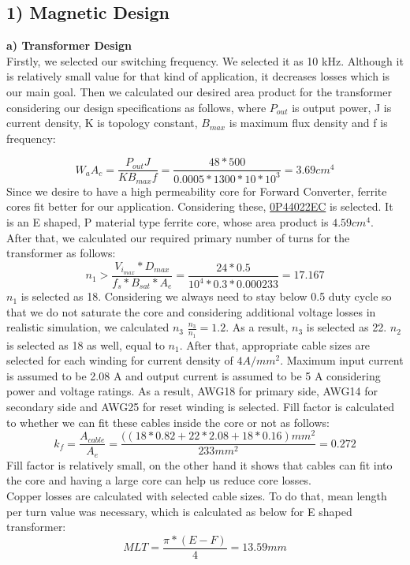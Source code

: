 \documentclass{article}
\newcommand\tab[1][1cm]{\hspace*{#1}}
\begin{document}
\subsection*{1) Magnetic Design}
\tab\textbf{a) Transformer Design} \\
\tab Firstly, we selected our switching frequency. We selected it as 10 kHz. Although it is relatively small value for that kind of application, it decreases losses which is our main goal. Then we calculated our desired area product for the transformer considering our design specifications as follows, where $P_{out}$ is output power, J is current density, K is topology constant, $B_{max}$ is maximum flux density and f is frequency:

 \begin{equation*}
     W_aA_c=\frac{P_{out}J}{K B_{max} f}=\frac{48*500}{0.0005*1300*10*10^3}=3.69 cm^4
 \end{equation*}
 \tab Since we desire to have a high permeability core for Forward Converter, ferrite cores fit better for our application. Considering these, \href{https://www.mag-inc.com/Media/Magnetics/Datasheets/0P44022EC.pdf}{0P44022EC} is selected. It is an E shaped, P material type ferrite core, whose area product is $4.59 cm^4$. \\
 \tab After that, we calculated our required primary number of turns for the transformer as follows:
 \begin{equation*}
    n_1>\frac{V_i_{max}*D_{max}}{f_s*B_{sat}*A_e}=\frac{24*0.5}{10^4*0.3*0.000233}=17.167
\end{equation*}
$n_1$ is selected as 18. Considering we always need to stay below 0.5 duty cycle so that we do not saturate the core and considering additional voltage losses in realistic simulation, we calculated $n_3$ $ \frac{n_3}{n_1}=1.2$. As a result, $n_3$ is selected as 22. $n_2$ is selected as 18 as well, equal to $n_1$. After that, appropriate cable sizes are selected for each winding for current density of $4 A/mm^2$. Maximum input current is assumed to be 2.08 A and output current is assumed to be 5 A considering power and voltage ratings. As a result, AWG18 for primary side, AWG14 for secondary side and AWG25 for reset winding is selected. Fill factor is calculated to whether we can fit these cables inside the core or not as follows:
\begin{equation*}
    k_f=\frac{A_{cable}}{A_e}=\frac{((18*0.82+22*2.08+18*0.16) mm^2}{233 mm^2}=0.272
\end{equation*}
Fill factor is relatively small, on the other hand it shows that cables can fit into the core and having a large core can help us reduce core losses. \\
\tab Copper losses are calculated with selected cable sizes. To do that, mean length per turn value was necessary, which is calculated as below for E shaped transformer:
\begin{equation*}
    MLT=\frac{ \pi*(E-F)}{4}= 13.59 mm
\end{equation*}
\end{document}
